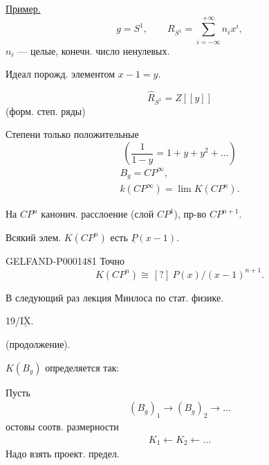 \underline{Пример.}
\begin{equation*}
g=S^1,\qquad R_{S^1}=\sum_{i=-\infty}^{+\infty}n_i x^i,
\end{equation*}
$n_i$ — целые, конечн. число ненулевых.

Идеал порожд. элементом $x-1=y$.

\begin{equation*}
\widehat R_{S^1}=Z[[y]]
\end{equation*}
(форм. степ. ряды)

Степени только положительные
\begin{equation*}
\left(\frac1{1-y}=1+y+y^2+\ldots\right)
\end{equation*}
\begin{gather*}
B_g=CP^\infty,\\
k(CP^\infty)=\lim K(CP^n).
\end{gather*}

На $CP^n$ канонич. расслоение (слой $CP^1$), пр-во $CP^{n+1}$.

Всякий элем. $K(CP^n)$ есть $\underline{P}(x-1)$.

\begin{GelfandAdjacentEvidence}{GELFAND-P000148}{1}
Точно
\begin{equation*}
K(CP^n)\cong\,[?]\ P(x)/(x-1)^{n+1}.
\end{equation*}
\end{GelfandAdjacentEvidence}

В следующий раз лекция Минлоса по стат. физике.



19/$\overline{\underline{\mathrm{IX}}}$. 

 (продолжение).

$K(B_g)$ определяется так:

Пусть
\begin{gather*}
(B_g)_1\longrightarrow(B_g)_2\longrightarrow\ldots
\end{gather*}
остовы соотв. размерности
\begin{gather*}
K_1\longleftarrow K_2\longleftarrow\ldots
\end{gather*}
Надо взять проект. предел.


